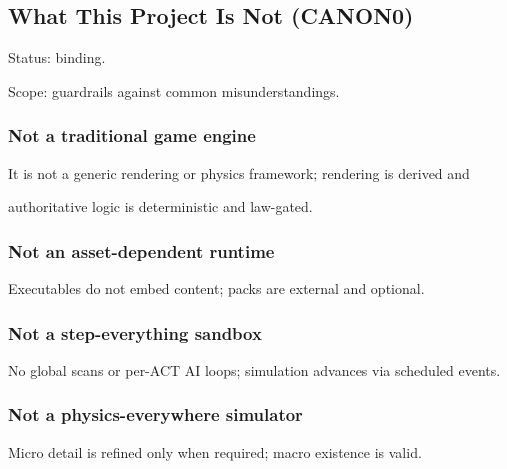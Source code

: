 \documentclass[9pt,a4paper,openany]{book}
\begin{document}
\subsection{What This Project Is Not (CANON0)}





Status: binding.\allowbreak{}



Scope: guardrails against common misunderstandings.\allowbreak{}






\subsubsection{Not a traditional game engine}


It is not a generic rendering or physics framework; rendering is derived and



authoritative logic is deterministic and law-\allowbreak{}gated.\allowbreak{}






\subsubsection{Not an asset-dependent runtime}


Executables do not embed content; packs are external and optional.\allowbreak{}






\subsubsection{Not a step-everything sandbox}


No global scans or per-\allowbreak{}ACT AI loops; simulation advances via scheduled events.\allowbreak{}






\subsubsection{Not a physics-everywhere simulator}


Micro detail is refined only when required; macro existence is valid.\allowbreak{}
\end{document}
